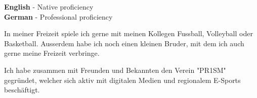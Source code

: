 \documentclass[9pt]{developercv} %
\begin{document}
\begin{minipage}[t]{0.3\textwidth}
	\vspace{-\baselineskip} %

	
	\textbf{English} - Native proficiency\\
	\textbf{German} - Professional proficiency\\
\end{minipage}
\hfill
\begin{minipage}[t]{0.3\textwidth}
	\vspace{-\baselineskip} %
	
	
	In meiner Freizeit spiele ich gerne mit meinen Kollegen Fussball, Volleyball oder Basketball. Ausserdem habe ich noch einen kleinen Bruder, mit dem ich auch gerne meine Freizeit verbringe.
\end{minipage}
\hfill
\begin{minipage}[t]{0.3\textwidth}
	\vspace{-\baselineskip} %
	
	
  Ich habe zusammen mit Freunden und Bekannten den Verein "PR1SM" gegründet, welcher sich aktiv mit digitalen Medien und regionalem E-Sports beschäftigt.
\end{minipage}

\end{document}

